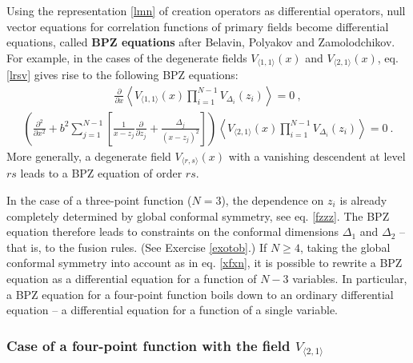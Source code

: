 \documentclass[12pt, a4paper, notitlepage, twoside]{report}
\numberwithin{equation}{section}
\theoremstyle{break}
\begin{document}
Using the representation \eqref{lmn} of creation operators as differential operators, null vector equations for correlation functions of primary fields become differential equations, called \textbf{\boldmath BPZ equations} after Belavin, Polyakov and Zamolodchikov. 
For example, in the cases of the degenerate fields $V_{\langle 1,1 \rangle}(x)$ and $V_{\langle 2,1 \rangle}(x)$, eq. \eqref{lrsv} gives rise to the following BPZ equations: 
\begin{align}
 {\frac{\partial}{\partial x}} \left\langle V_{\langle 1,1 \rangle}(x) \prod_{i=1}^{N-1} V_{\Delta_i}(z_i) \right\rangle = 0 \ ,
\label{pvoo} 
\end{align}
\begin{align}
\boxed{\left( \frac{\partial^2}{\partial x^2}  +b^2 \sum_{j=1}^{N-1} \left[\frac{1}{x-z_j}{\frac{\partial}{\partial z_j}}+ \frac{\Delta_j}{(x-z_j)^2} \right]\right)\left\langle V_{\langle 2,1 \rangle}(x) \prod_{i=1}^{N-1} V_{\Delta_i}(z_i) \right\rangle = 0} \ .
\label{pvot}
\end{align}
More generally, a degenerate field $V_{\langle r,s \rangle}(x)$ with a vanishing descendent at level $rs$ leads to a BPZ equation of order $rs$. 

In the case of a three-point function ($N=3$), the dependence on $z_i$ is already completely determined by global conformal symmetry, see eq. \eqref{fzzz}.
The BPZ equation therefore leads to constraints on the conformal dimensions $\Delta_1$ and $\Delta_2$ -- that is, to the fusion rules. (See Exercise \ref{exotob}.) If $N\geq 4$, taking the global conformal symmetry into account as in eq. \eqref{xfxn}, it is possible to rewrite a BPZ equation as a differential equation for a function of $N-3$ variables.
In particular, a BPZ equation for a four-point function boils down to an ordinary differential equation -- a differential equation for a function of a single variable.  

\subsubsection{Case of a four-point function with the field $V_{\langle 2,1 \rangle}$}
\end{document}
